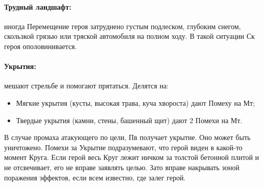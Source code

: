 \paragraph{Трудный ландшафт:} иногда Перемещение героя затруднено густым подлеском, глубоким снегом, скользкой грязью или тряской автомобиля на полном ходу. В такой ситуации Ск героя ополовинивается.
\paragraph{Укрытия:} мешают стрельбе и помогают прятаться. Делятся на: 
\begin{itemize}
  \item Мягкие укрытия (кусты, высокая трава, куча хвороста) дают Помеху на Мт;
  \item Твердые укрытия  (камни, стены, башенный щит) дают 2 Помехи на Мт. 
\end{itemize}
В случае промаха атакующего по цели, Пв получает укрытие. Оно может быть уничтожено.
\newline Помехи за Укрытие подразумевают, что герой виден в какой-то момент Круга. Если герой весь Круг лежит ничком за толстой бетонной плитой и не отсвечивает, его не вправе заявлять целью. Зато вправе накрывать зоной поражения эффектов, если всем известно, где залег герой.

